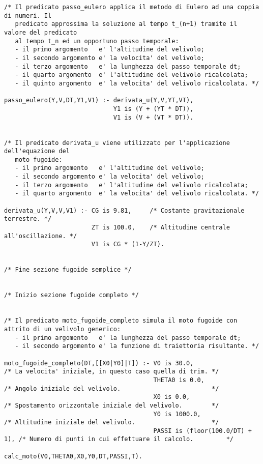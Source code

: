 \begin{verbatim}
/* Il predicato passo_eulero applica il metodo di Eulero ad una coppia di numeri. Il
   predicato approssima la soluzione al tempo t_(n+1) tramite il valore del predicato 
   al tempo t_n ed un opportuno passo temporale: 
   - il primo argomento   e' l'altitudine del velivolo;
   - il secondo argomento e' la velocita' del velivolo;
   - il terzo argomento   e' la lunghezza del passo temporale dt;
   - il quarto argomento  e' l'altitudine del velivolo ricalcolata;
   - il quinto argomento  e' la velocita' del velivolo ricalcolata. */

passo_eulero(Y,V,DT,Y1,V1) :- derivata_u(Y,V,YT,VT),
                              Y1 is (Y + (YT * DT)),
                              V1 is (V + (VT * DT)).


/* Il predicato derivata_u viene utilizzato per l'applicazione dell'equazione del 
   moto fugoide:
   - il primo argomento   e' l'altitudine del velivolo;
   - il secondo argomento e' la velocita' del velivolo;
   - il terzo argomento   e' l'altitudine del velivolo ricalcolata;
   - il quarto argomento  e' la velocita' del velivolo ricalcolata. */

derivata_u(Y,V,V,V1) :- CG is 9.81,     /* Costante gravitazionale terrestre. */
                        ZT is 100.0,    /* Altitudine centrale all'oscillazione. */
                        V1 is CG * (1-Y/ZT).


/* Fine sezione fugoide semplice */


/* Inizio sezione fugoide completo */


/* Il predicato moto_fugoide_completo simula il moto fugoide con attrito di un velivolo generico:
   - il primo argomento   e' la lunghezza del passo temporale dt;
   - il secondo argomento e' la funzione di traiettoria risultante. */

moto_fugoide_completo(DT,[[X0|Y0]|T]) :- V0 is 30.0,                     /* La velocita' iniziale, in questo caso quella di trim. */
                                         THETA0 is 0.0,                  /* Angolo iniziale del velivolo.                         */
                                         X0 is 0.0,                      /* Spostamento orizzontale iniziale del velivolo.        */
                                         Y0 is 1000.0,                   /* Altitudine iniziale del velivolo.                     */
                                         PASSI is (floor(100.0/DT) + 1), /* Numero di punti in cui effettuare il calcolo.         */
                                         calc_moto(V0,THETA0,X0,Y0,DT,PASSI,T).



\end{verbatim}
